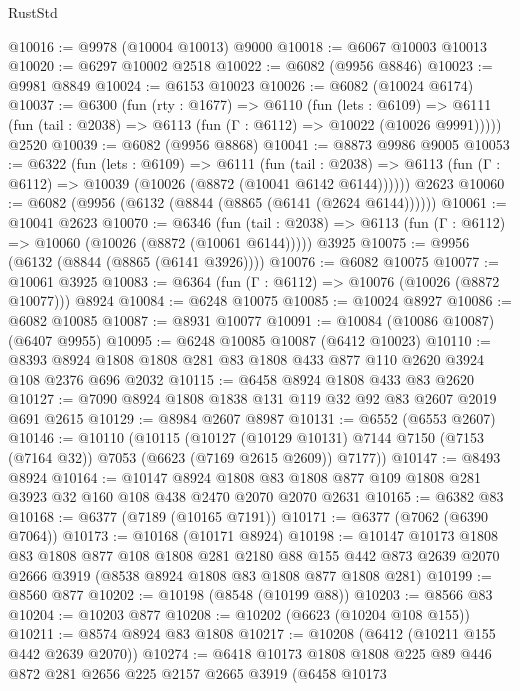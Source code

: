 \begin{lexlean}{RustStd}
\begin{coremodule}
@10016 := @9978 (@10004 @10013) @9000
@10018 := @6067 @10003 @10013
@10020 := @6297 @10002 @2518
@10022 := @6082 (@9956 @8846)
@10023 := @9981 @8849
@10024 := @6153 @10023
@10026 := @6082 (@10024 @6174)
@10037 := @6300
    (fun (rty : @1677) =>
    @6110
      (fun (lets : @6109) =>
      @6111 (fun (tail : @2038) => @6113 (fun (Γ : @6112) => @10022 (@10026 @9991)))))
    @2520
@10039 := @6082 (@9956 @8868)
@10041 := @8873 @9986 @9005
@10053 := @6322
    (fun (lets : @6109) =>
    @6111
      (fun (tail : @2038) =>
      @6113 (fun (Γ : @6112) => @10039 (@10026 (@8872 (@10041 @6142 @6144))))))
    @2623
@10060 := @6082 (@9956 (@6132 (@8844 (@8865 (@6141 (@2624 @6144))))))
@10061 := @10041 @2623
@10070 := @6346
    (fun (tail : @2038) => @6113 (fun (Γ : @6112) => @10060 (@10026 (@8872 (@10061 @6144)))))
    @3925
@10075 := @9956 (@6132 (@8844 (@8865 (@6141 @3926))))
@10076 := @6082 @10075
@10077 := @10061 @3925
@10083 := @6364 (fun (Γ : @6112) => @10076 (@10026 (@8872 @10077))) @8924
@10084 := @6248 @10075
@10085 := @10024 @8927
@10086 := @6082 @10085
@10087 := @8931 @10077
@10091 := @10084 (@10086 @10087) (@6407 @9955)
@10095 := @6248 @10085 @10087 (@6412 @10023)
@10110 := @8393 @8924 @1808 @1808 @281 @83 @1808 @433 @877 @110 @2620 @3924 @108 @2376 @696 @2032
@10115 := @6458 @8924 @1808 @433 @83 @2620
@10127 := @7090 @8924 @1808 @1838 @131 @119 @32 @92 @83 @2607 @2019 @691 @2615
@10129 := @8984 @2607 @8987
@10131 := @6552 (@6553 @2607)
@10146 := @10110
    (@10115
      (@10127
        (@10129 @10131)
        @7144
        @7150
        (@7153 (@7164 @32))
        @7053
        (@6623 (@7169 @2615 @2609))
        @7177))
@10147 := @8493 @8924
@10164 := @10147
    @8924
    @1808
    @83
    @1808
    @877
    @109
    @1808
    @281
    @3923
    @32
    @160
    @108
    @438
    @2470
    @2070
    @2070
    @2631
@10165 := @6382 @83
@10168 := @6377 (@7189 (@10165 @7191))
@10171 := @6377 (@7062 (@6390 @7064))
@10173 := @10168 (@10171 @8924)
@10198 := @10147
    @10173
    @1808
    @83
    @1808
    @877
    @108
    @1808
    @281
    @2180
    @88
    @155
    @442
    @873
    @2639
    @2070
    @2666
    @3919
    (@8538 @8924 @1808 @83 @1808 @877 @1808 @281)
@10199 := @8560 @877
@10202 := @10198 (@8548 (@10199 @88))
@10203 := @8566 @83
@10204 := @10203 @877
@10208 := @10202 (@6623 (@10204 @108 @155))
@10211 := @8574 @8924 @83 @1808
@10217 := @10208 (@6412 (@10211 @155 @442 @2639 @2070))
@10274 := @6418
    @10173
    @1808
    @1808
    @225
    @89
    @446
    @872
    @281
    @2656
    @225
    @2157
    @2665
    @3919
    (@6458
      @10173

\end{coremodule}
\end{lexlean}
